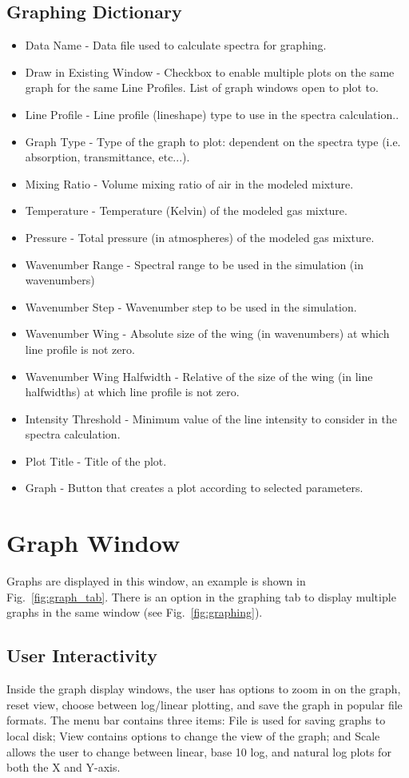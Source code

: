 \documentclass[12pt]{article}
\begin{document}
\subsection*{Graphing Dictionary}
\begin{itemize}
\item Data Name - Data file used to calculate spectra for graphing.
\item Draw in Existing Window - Checkbox to enable multiple plots on the same graph for the same Line Profiles. List of graph windows open to plot to.
\item Line Profile - Line profile (lineshape) type to use in the spectra calculation..
\item Graph Type - Type of the graph to plot: dependent on the spectra type (i.e. absorption, transmittance, etc...).
\item Mixing Ratio - Volume mixing ratio of air in the modeled mixture.
\item Temperature - Temperature (Kelvin) of the modeled gas mixture.
\item Pressure - Total pressure (in atmospheres) of the modeled gas mixture.
\item Wavenumber Range - Spectral range to be used in the simulation (in wavenumbers)
\item Wavenumber Step - Wavenumber step to be used in the simulation.
\item Wavenumber Wing - Absolute size of the wing (in wavenumbers) at which line profile is not zero.
\item Wavenumber Wing Halfwidth - Relative of the size of the wing (in line halfwidths) at which line profile is not zero.
\item Intensity Threshold - Minimum value of the line intensity to consider in the spectra calculation.
\item Plot Title - Title of the plot.
\item Graph - Button that creates a plot according to selected parameters.
\end{itemize}

\section{Graph Window}
Graphs are displayed in this window, an example is shown in Fig.~\ref{fig:graph_tab}. There is an option in the graphing tab to display multiple graphs in the same window (see Fig.~\ref{fig:graphing}). 

\subsection{User Interactivity}
Inside the graph display windows, the user has options to zoom in on the graph, reset view, choose between log/linear plotting, and save the graph in popular file formats. The menu bar contains three items: File is used for saving graphs to local disk; View contains options to change the view of the graph; and Scale allows the user to change between linear, base 10 log, and natural log plots for both the X and Y-axis. 
\end{document}
